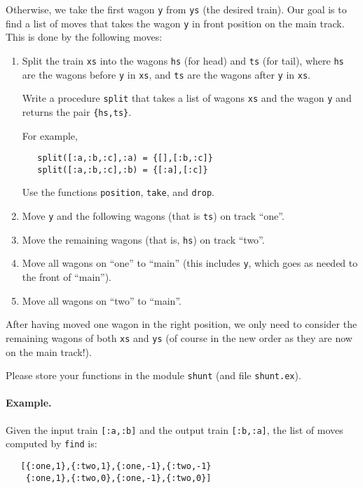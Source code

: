 \documentclass[a4paper,11pt]{article}
\begin{document}
Otherwise, we take the first wagon \verb+y+ from \verb+ys+ (the
desired train). Our goal is to find a list of moves that takes
the wagon \verb+y+ in front position on the main track. This is
done by the following moves:
\begin{enumerate}
  
\item Split the train \verb+xs+ into the wagons \verb+hs+ (for head) and
  \verb+ts+ (for tail), where \verb+hs+ are the wagons before \verb+y+
  in \verb+xs+, and \verb+ts+ are the wagons after \verb+y+ in \verb+xs+.

  Write a procedure \verb+split+ that takes a list of wagons
  \verb+xs+ and the wagon \verb+y+ and returns the pair \verb+{hs,ts}+.

  For example, 
\begin{verbatim}
   split([:a,:b,:c],:a) = {[],[:b,:c]}
   split([:a,:b,:c],:b) = {[:a],[:c]}
\end{verbatim}
  
  Use the functions \verb+position+, \verb+take+, and \verb+drop+.

\item Move \verb+y+ and the following wagons (that is \verb+ts+) on track
  ``one''.
  
\item Move the remaining wagons (that is, \verb+hs+) on track
  ``two''.
  
\item Move all wagons on ``one'' to ``main'' (this includes \verb+y+,
  which goes as needed to the front of ``main'').
  
\item Move all wagons on ``two'' to ``main''.
\end{enumerate}

After having moved one wagon in the right position, we only need
to consider the remaining wagons of both \verb+xs+ and \verb+ys+
(of course in the new order as they are now on the main track!).

Please store your functions in the module \verb+shunt+ (and file
\verb+shunt.ex+).


\paragraph{Example.}
Given the input train \verb+[:a,:b]+ and the output train \verb+[:b,:a]+, the
list of moves computed by \verb+find+ is:
\begin{verbatim}
   [{:one,1},{:two,1},{:one,-1},{:two,-1} 
    {:one,1},{:two,0},{:one,-1},{:two,0}]
\end{verbatim}
\end{document}
